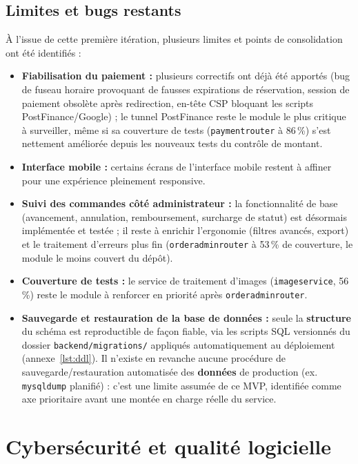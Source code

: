 \documentclass[12pt, a4paper]{report}
\renewcommand{\_}{\origunderscore\allowbreak}
\begin{document}
\section{Limites et bugs restants}

À l'issue de cette première itération, plusieurs limites et points de consolidation ont été identifiés :

\begin{itemize}
    \item \textbf{Fiabilisation du paiement :} plusieurs correctifs ont déjà été apportés (bug de fuseau horaire provoquant de fausses expirations de réservation, session de paiement obsolète après redirection, en-tête CSP bloquant les scripts PostFinance/Google) ; le tunnel PostFinance reste le module le plus critique à surveiller, même si sa couverture de tests (\texttt{payment\_router} à 86\,\%) s'est nettement améliorée depuis les nouveaux tests du contrôle de montant.
    \item \textbf{Interface mobile :} certains écrans de l'interface mobile restent à affiner pour une expérience pleinement responsive.
    \item \textbf{Suivi des commandes côté administrateur :} la fonctionnalité de base (avancement, annulation, remboursement, surcharge de statut) est désormais implémentée et testée ; il reste à enrichir l'ergonomie (filtres avancés, export) et le traitement d'erreurs plus fin (\texttt{order\_admin\_router} à 53\,\% de couverture, le module le moins couvert du dépôt).
    \item \textbf{Couverture de tests :} le service de traitement d'images (\texttt{image\_service}, 56\,\%) reste le module à renforcer en priorité après \texttt{order\_admin\_router}.
    \item \textbf{Sauvegarde et restauration de la base de données :} seule la \textbf{structure} du schéma est reproductible de façon fiable, via les scripts SQL versionnés du dossier \texttt{backend/migrations/} appliqués automatiquement au déploiement (annexe~\ref{lst:ddl}). Il n'existe en revanche aucune procédure de sauvegarde/restauration automatisée des \textbf{données} de production (ex. \texttt{mysqldump} planifié) : c'est une limite assumée de ce MVP, identifiée comme axe prioritaire avant une montée en charge réelle du service.
\end{itemize}

\chapter{Cybersécurité et qualité logicielle}
\end{document}
